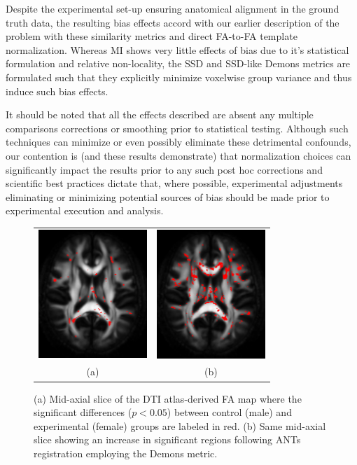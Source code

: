 \documentclass[final,5p,times,twocolumn]{elsarticle}
\begin{document}
Despite the experimental set-up ensuring anatomical alignment in the
ground truth data, the resulting bias effects accord with our earlier 
description of the problem with these similarity metrics and direct
FA-to-FA template normalization.  
Whereas MI shows very little effects of bias due to it's statistical
formulation and relative non-locality, the SSD and SSD-like Demons
metrics are formulated such that they explicitly minimize voxelwise
group variance and thus induce such bias effects.

It should be noted that all the effects described are absent
any multiple comparisons corrections or smoothing prior to statistical
testing.  Although such techniques can minimize 
or even possibly eliminate these detrimental confounds, our contention
is (and these results demonstrate) that normalization choices can significantly
impact the results prior to any such
post hoc corrections and scientific best practices dictate that, where possible, 
experimental adjustments eliminating or minimizing potential sources of bias should
be made prior to experimental execution and analysis.  




\begin{figure}
\begin{center}
\begin{tabular}{cc}
  \includegraphics[width=41mm]{no_registration_voxelwise_slice90.png} &
  \includegraphics[width=41mm]{demons_voxelwise_slice90.png} \\
  (a) & (b)
\end{tabular}
\caption{(a) Mid-axial slice of the DTI atlas-derived FA map where the 
significant differences ($p < 0.05$) between control (male) and 
experimental (female) groups are labeled in red.  (b) Same mid-axial 
slice showing an increase in significant regions following ANTs 
registration employing the Demons metric.
}
\label{fig:simulated_significance}
\end{center}        
\end{figure}
\end{document}
